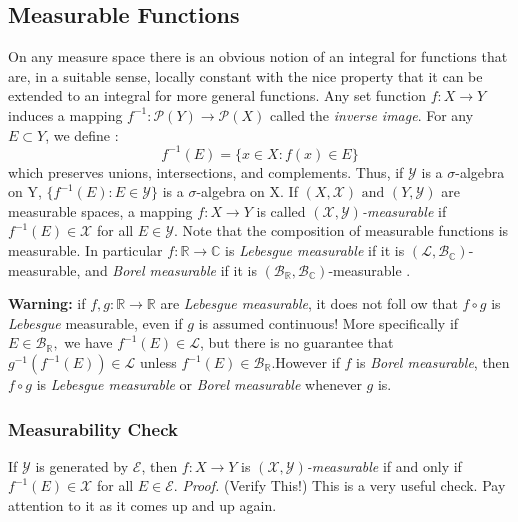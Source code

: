 \documentclass{article}
\begin{document}
\subsection{Measurable Functions}
On any measure space there is an obvious notion of an integral for functions that are, in a suitable sense, locally constant with the nice property that it can be extended to an integral for more general functions. Any set function $f:X\to Y$ induces a mapping $f^{-1}: \mathcal{P}(Y) \to \mathcal{P}(X)$ called the \emph{inverse image}. For any $E\subset Y$, we define :
\[
f^{-1}(E)=\{x\in X:f(x) \in E\}
\] which preserves unions, intersections, and complements. Thus, if $\mathcal{Y}$ is a $\sigma$-algebra on Y, $\{f^{-1}(E):E \in \mathcal{Y}\}$ is a $\sigma$-algebra on X. If $(X, \mathcal{X})\text{ and } (Y, \mathcal{Y})$ are measurable spaces, a mapping $f:X\to Y$ is called  \emph{$(\mathcal{X}, \mathcal{Y})$-measurable} if $f^{-1}(E) \in \mathcal{X}$ for all $E \in \mathcal{Y}$. Note that the composition of measurable functions is measurable. In particular $f:\mathbb{R}\to\mathbb{C}$ is \emph{Lebesgue measurable} if it is $(\mathcal{L},\mathcal{B}_\mathbb{C})$-measurable, and \emph{Borel measurable} if it is $(\mathcal{B}_\mathbb{R},\mathcal{B}_\mathbb{C})$-measurable . \newline \newline

\textbf{Warning:} if $f,g:\mathbb{R}\to\mathbb{R}$ are \emph{Lebesgue measurable}, it does not foll  ow that $f\circ g$ is \emph{Lebesgue} measurable, even if $g$ is assumed continuous! More specifically if $E\in \mathcal{B}_\mathbb{R},$ we have $f^{-1}(E)\in \mathcal{L}$, but there is no guarantee that $g^{-1}(f^{-1}(E))\in \mathcal{L}$ unless $f^{-1}(E) \in \mathcal{B}_\mathbb{R}$.However if $f$ is \emph{Borel measurable}, then $f\circ g$ is \emph{Lebesgue  measurable} or \emph{Borel measurable} whenever $g$ is.

\subsubsection{Measurability Check}
If $\mathcal{Y}$ is generated by $\mathcal{E}$, then $f:X\to Y$ is \emph{$(\mathcal{X}, \mathcal{Y})$-measurable} if and only if $f^{-1}(E)\in \mathcal{X}$ for all $E \in\mathcal{E}$.\newline \newline 
\textit{Proof.}\newline \newline 
(Verify This!) \newline \newline
This is a very useful check. Pay attention to it as it comes up and up again.
\end{document}
